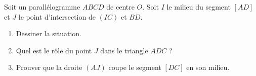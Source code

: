 
\begin{exercice}\label{exoSeconde-0099}

    Soit un parallélogramme \( ABCD\) de centre \( O\). Soit \( I\) le milieu du segment \( [AD]\) et \( J\) le point d'intersection de \( (IC)\) et \( BD\).
    \begin{enumerate}
        \item
            Dessiner la situation.
        \item
            Quel est le rôle du point \( J\) dans le triangle \( ADC\) ?
        \item
            Prouver que la droite \( (AJ)\) coupe le segment \( [DC]\) en son milieu.
    \end{enumerate}

\end{exercice}
